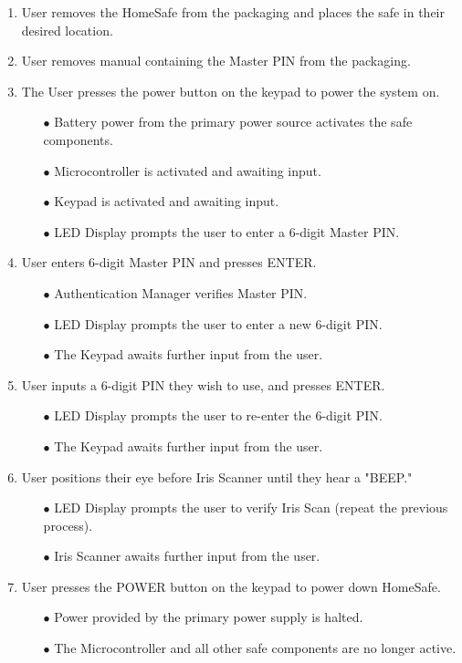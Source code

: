 \documentclass{article}
\begin{document}
\begin{enumerate}
    \item User removes the HomeSafe from the packaging and places the safe in their desired location.
    \item User removes manual containing the Master PIN from the packaging.
    \item The User presses the power button on the keypad to power the system on.
    \begin{enumerate}
        \item[$\bullet$] Battery power from the primary power source activates the safe components.
        \item[$\bullet$] Microcontroller is activated and awaiting input.
        \item[$\bullet$] Keypad is activated and awaiting input.
        \item[$\bullet$] LED Display prompts the user to enter a 6-digit Master PIN.
    \end{enumerate}
    \item User enters 6-digit Master PIN and presses ENTER.
    \begin{enumerate}
        \item[$\bullet$] Authentication Manager verifies Master PIN.
        \item[$\bullet$] LED Display prompts the user to enter a new 6-digit PIN.
        \item[$\bullet$] The Keypad awaits further input from the user.
    \end{enumerate}
    \item User inputs a 6-digit PIN they wish to use, and presses ENTER.
    \begin{enumerate}
        \item[$\bullet$] LED Display prompts the user to re-enter the 6-digit PIN.
        \item[$\bullet$] The Keypad awaits further input from the user.
    \end{enumerate}
    \item User positions their eye before Iris Scanner until they hear a "BEEP."
    \begin{enumerate}
        \item[$\bullet$] LED Display prompts the user to verify Iris Scan (repeat the previous process).
        \item[$\bullet$] Iris Scanner awaits further input from the user.
    \end{enumerate}
    \item User presses the POWER button on the keypad to power down HomeSafe.
    \begin{enumerate}
        \item[$\bullet$] Power provided by the primary power supply is halted.
        \item[$\bullet$] The Microcontroller and all other safe components are no longer active.
    \end{enumerate}
\end{enumerate}
\end{document}
